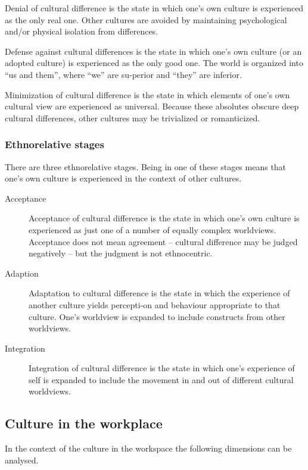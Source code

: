 \begin{description}
	\tightlist
	\item[Denial] Denial of cultural difference is the state in which one’s own culture is experienced as the only real one. Other cultures are avoided by maintaining psychological and/or physical isolation from differences.
	\item[Defense] Defense against cultural differences is the state in which one’s own culture (or an adopted culture) is experienced as the only good one. The world is organized into “us and them”, where “we” are su-perior and “they” are inferior.
	\item[Minimization] Minimization of cultural difference is the state in which elements of one’s own cultural view are experienced as universal. Because these absolutes obscure deep cultural differences, other cultures may be trivialized or romanticized.
\end{description}

\subsubsection{Ethnorelative stages}
There are three ethnorelative stages. Being in one of these stages means that one’s own culture is experienced in the context of other cultures.

\begin{description}
	\item[Acceptance] Acceptance of cultural difference is the state in which one’s own culture is experienced as just one of a number of equally complex worldviews. Acceptance does not mean agreement – cultural difference may be judged negatively – but the judgment is not ethnocentric.
	\item[Adaption] Adaptation to cultural difference is the state in which the experience of another culture yields percepti-on and behaviour appropriate to that culture. One’s worldview is expanded to include constructs from other worldviews.
	\item[Integration] Integration of cultural difference is the state in which one’s experience of self is expanded to include the movement in and out of different cultural worldviews.
\end{description}

\subsection{Culture in the workplace}
In the context of the culture in the workspace the following dimensions can be analysed.

